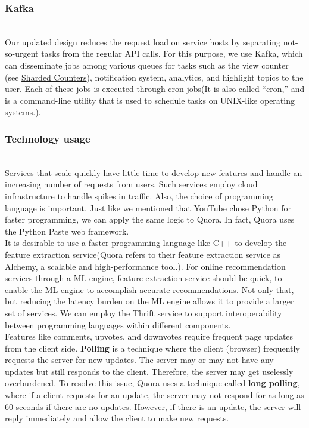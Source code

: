 \subsubsection{Kafka}\label{gfNnDl0nfEgMlUzldnwm5}
\\
Our updated design reduces the request load on service hosts by separating not-so-urgent tasks from the regular API calls. For this purpose, we use Kafka, which can disseminate jobs among various queues for tasks such as the view counter (see \href{https://www.educative.io/courses/grokking-the-system-design-interview/system-design-the-sharded-counters}{Sharded Counters}), notification system, analytics, and highlight topics to the user. Each of these jobs is executed through cron jobs(It is also called ``cron,'' and is a command-line utility that is used to schedule tasks on UNIX-like operating systems.).

\subsubsection{Technology usage}\label{gQHazwEVepuuGW6Xq_fuB}
\\
Services that scale quickly have little time to develop new features and handle an increasing number of requests from users. Such services employ cloud infrastructure to handle spikes in traffic. Also, the choice of programming language is important. Just like we mentioned that YouTube chose Python for faster programming, we can apply the same logic to Quora. In fact, Quora uses the Python Paste web framework.
\\
It is desirable to use a faster programming language like C++ to develop the feature extraction service(Quora refers to their feature extraction service as Alchemy, a scalable and high-performance tool.). For online recommendation services through a ML engine, feature extraction service should be quick, to enable the ML engine to accomplish accurate recommendations. Not only that, but reducing the latency burden on the ML engine allows it to provide a larger set of services. We can employ the Thrift service to support interoperability between programming languages within different components.
\\
Features like comments, upvotes, and downvotes require frequent page updates from the client side. \textbf{Polling} is a technique where the client (browser) frequently requests the server for new updates. The server may or may not have any updates but still responds to the client. Therefore, the server may get uselessly overburdened. To resolve this issue, Quora uses a technique called \textbf{long polling}, where if a client requests for an update, the server may not respond for as long as 60 seconds if there are no updates. However, if there is an update, the server will reply immediately and allow the client to make new requests.

